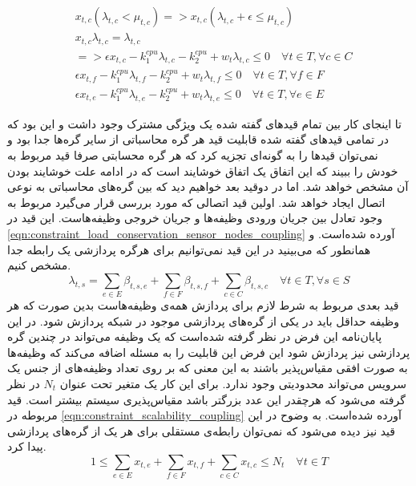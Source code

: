 	\begin{subequations}\label{eqn:constraint_queue_stability}
		\begin{align}
		&x_{t,c}(\lambda_{t,c} < \mu_{t,c}) => x_{t,c}(\lambda_{t,c} + \epsilon \le \mu_{t,c}) \\
		&x_{t,c}\lambda_{t,c} = \lambda_{t,c} \label{eqn:lambda_eqn}\\
		&=> \epsilon x_{t,c} - k_1^{cpu}\lambda_{t,c} - k_2^{cpu} + w_t\lambda_{t,c} \le 0 \quad \forall{t \in T}, \forall{c \in C} \\
		&\epsilon x_{t,f} - k_1^{cpu}\lambda_{t,f} - k_2^{cpu} + w_t\lambda_{t,f} \le 0 \quad \forall{t \in T}, \forall{f \in F} \\
		&\epsilon x_{t,e} - k_1^{cpu}\lambda_{t,e} - k_2^{cpu} + w_t\lambda_{t,e} \le 0 \quad \forall{t \in T}, \forall{e \in E}
		\end{align}
	\end{subequations}

	تا اینجای کار بین تمام قیدهای گفته شده یک ویژگی مشترک وجود داشت و این بود که در تمامی قیدهای گفته شده قابلیت قید هر گره محاسباتی از سایر گره‌ها جدا بود و نمی‌توان قیدها را به گونه‌ای تجزیه کرد که هر گره محسابتی صرفا قید مربوط به خودش را ببیند که این اتفاق یک اتفاق خوشایند است که در ادامه علت خوشایند بودن آن مشخص خواهد شد. اما در دوقید بعد خواهیم دید که بین گره‌های محاسباتی به نوعی اتصال ایجاد خواهد شد. 
	اولین قید اتصالی که مورد بررسی قرار می‌گیرد مربوط به وجود تعادل بین جریان ورودی وظیفه‌ها و جریان خروجی وظیفه‌هاست. این قید در \cref{eqn:constraint_load_conservation_sensor_nodes_coupling} آورده شده‌است. و همانطور که می‌بینید در این قید نمی‌توانیم برای هرگره پردازشی یک رابطه جدا مشخص کنیم. 
	\begin{equation}\label{eqn:constraint_load_conservation_sensor_nodes_coupling}
	\lambda_{t,s} = \sum_{e \in E} \beta_{t,s,e} + \sum_{f 	\in F} \beta_{t,s,f}
	+\sum_{c \in C}\beta_{t,s,c} \quad \forall{t \in T}, \forall{s \in S}
	\end{equation} 
	قید بعدی مربوط به شرط لازم برای پردازش همه‌ی وظیفه‌هاست بدین صورت که هر وظیفه حداقل باید در یکی از گره‌های پردازشی موجود در شبکه پردازش شود. در این پایان‌نامه این فرض در نظر گرفته شده‌است که یک وظیفه می‌تواند در چندین گره پردازشی نیز پردازش شود این فرض این قابلیت را به مسئله اضافه می‌کند که وظیفه‌ها به صورت افقی مقیاس‌پذیر باشند به این معنی که بر روی تعداد وظیفه‌های از جنس یک سرویس می‌تواند محدودیتی وجود ندارد. برای این کار یک متغیر تحت عنوان $N_t$ در نظر گرفته می‌شود که هرچقدر این عدد بزرگتر باشد مقیاس‌پذیری سیستم بیشتر است. قید مربوطه در \cref{eqn:constraint_scalability_coupling} آورده شده‌است. به وضوح در این قید نیز دیده می‌شود که نمی‌توان رابطه‌ی مستقلی برای هر یک از گره‌های پردازشی پیدا کرد. 
	\begin{equation}\label{eqn:constraint_scalability_coupling}
		1 \le \sum_{e \in E}x_{t,e} + \sum_{f \in F}x_{t,f} + \sum_{c \in C}x_{t,c} \le N_t \quad \forall{t \in T}
	\end{equation}
	

